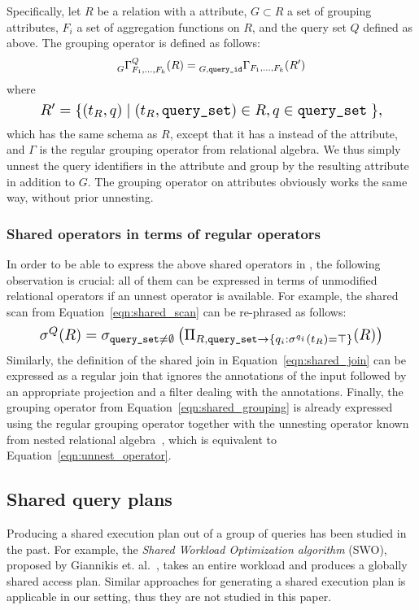 Specifically, let $R$ be a relation with a \qset attribute,
$G \subset R$ a set of grouping attributes,
$F_i$ a set of aggregation functions on $R$,
and the query set $Q$ defined as above.
The grouping operator is defined as follows:
%
\begin{equation}
  \prescript{}{G}{\Gamma}^Q_{F_1,\ldots,F_k}(R) = \prescript{}{G,\text{{\texttt{query\_id}}}}{\Gamma}_{F_1,\ldots,F_k}(R')
  \label{eqn:shared_grouping}
\end{equation}
where
\begin{equation}
    \resizebox{.9\hsize}{!}{
        $R' = \{ (t_R,q) \;|\; (t_R, \text{\qset}) \in R, q \in \text{\qset} \; \},$
    }
  \label{eqn:unnest_operator}
\end{equation}
%
which has the same schema as $R$,
except that it has a \qid instead of the \qset attribute,
and $\Gamma$ is the regular grouping operator from relational algebra.
We thus simply unnest the query identifiers in the \qset attribute
and group by the resulting \qid attribute in addition to $G$.
The grouping operator on \qid attributes
obviously works the same way, without prior unnesting.

\subsubsection{Shared operators in terms of regular operators}

In order to be able to express the above shared operators in \sql, the following
observation is crucial: all of them can be expressed in terms of unmodified
relational operators if an unnest operator is available.  For example, the
shared scan from Equation~\ref{eqn:shared_scan} can be re-phrased as follows:
%
\begin{equation}
    \resizebox{.9\hsize}{!}{
        $\sigma^Q(R) = \sigma_{\qset \neq \emptyset}\left(
            \Pi_{R, \qset \rightarrow \{q_i : \sigma^{q_i}(t_R)  = \top \}}(R) \right)$
    }
\end{equation}
%
Similarly, the definition of the shared join in Equation~\ref{eqn:shared_join}
can be expressed as a regular join that ignores the annotations of the input
followed by an appropriate projection and a filter dealing with the annotations.
Finally, the grouping operator from Equation~\ref{eqn:shared_grouping} is
already expressed using the regular grouping operator together with the
unnesting operator known from nested relational algebra~\cite{Colby1989}, which
is equivalent to Equation~\ref{eqn:unnest_operator}.

\subsection{Shared query plans}
\label{sec:shared_plans}

Producing a shared execution plan out of a group of queries has been studied in
the past. For example, the {\it Shared Workload Optimization algorithm} (SWO),
proposed by Giannikis et. al.~\cite{Giannikis:2014:SWO:2732279.2732280}, takes
an entire workload and produces a globally shared access plan. Similar
approaches for generating a shared execution plan is applicable in
our setting, thus they are not studied in this paper.
